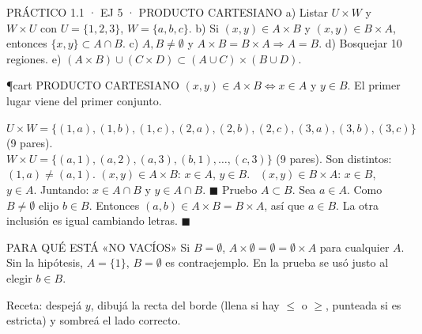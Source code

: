 \begin{enunciado}{PRÁCTICO 1.1 · EJ 5 · PRODUCTO CARTESIANO}
a) Listar $U\times W$ y $W\times U$ con $U=\{1,2,3\}$, $W=\{a,b,c\}$. b) Si $(x,y)\in A\times B$ y $(x,y)\in B\times A$, entonces $\{x,y\}\subset A\cap B$. c) $A,B\neq\emptyset$ y $A\times B=B\times A\Rightarrow A=B$. d) Bosquejar 10 regiones. e) $(A\times B)\cup(C\times D)\subset(A\cup C)\times(B\cup D)$.
\end{enunciado}
\begin{uso}{\P{cart} PRODUCTO CARTESIANO}
$(x,y)\in A\times B\iff x\in A$ y $y\in B$. El primer lugar viene del primer conjunto.
\end{uso}
$U\times W=\{(1,a),(1,b),(1,c),(2,a),(2,b),(2,c),(3,a),(3,b),(3,c)\}$ (9 pares).\\
$W\times U=\{(a,1),(a,2),(a,3),(b,1),\dots,(c,3)\}$ (9 pares). Son distintos: $(1,a)\neq(a,1)$.
$(x,y)\in A\times B$: $x\in A$, $y\in B$. \ $(x,y)\in B\times A$: $x\in B$, $y\in A$. Juntando: $x\in A\cap B$ y $y\in A\cap B$. $\blacksquare$
Pruebo $A\subset B$. Sea $a\in A$. Como $B\neq\emptyset$ elijo $b\in B$. Entonces $(a,b)\in A\times B=B\times A$, así que $a\in B$. La otra inclusión es igual cambiando letras. $\blacksquare$
\begin{trampa}{PARA QUÉ ESTÁ «NO VACÍOS»}
Si $B=\emptyset$, $A\times\emptyset=\emptyset=\emptyset\times A$ para cualquier $A$. Sin la hipótesis, $A=\{1\}$, $B=\emptyset$ es contraejemplo. En la prueba se usó justo al elegir $b\in B$.
\end{trampa}
Receta: despejá $y$, dibujá la recta del borde (llena si hay $\le$ o $\ge$, punteada si es estricta) y sombreá el lado correcto.

